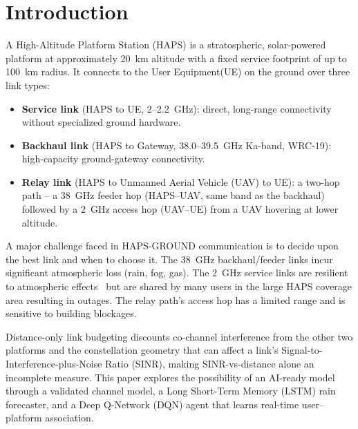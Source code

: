 \documentclass[]{ieeeaccess}
\begin{document}
\titlepgskip=-15pt

\maketitle

\section{Introduction}

A High-Altitude Platform Station (HAPS) is a stratospheric, solar-powered platform at approximately 20~km altitude with a fixed service footprint of up to 100~km radius. It connects to the User Equipment(UE) on the ground over three link types:

\begin{itemize}\setlength{\itemsep}{1pt}
  \item \textbf{Service link} (HAPS to UE, 2--2.2~GHz): direct, long-range connectivity without specialized ground hardware.
  \item \textbf{Backhaul link} (HAPS to Gateway, 38.0--39.5~GHz Ka-band, WRC-19): high-capacity ground-gateway connectivity.
  \item \textbf{Relay link} (HAPS to Unmanned Aerial Vehicle (UAV) to UE): a two-hop path -- a 38~GHz feeder hop (HAPS--UAV, same band as the backhaul) followed by a 2~GHz access hop (UAV--UE) from a UAV hovering at lower altitude.
\end{itemize}

A major challenge faced in HAPS-GROUND communication is to decide upon the best link and when to choose it. The 38~GHz backhaul/feeder links incur significant atmospheric loss (rain, fog, gas). The 2~GHz service links are resilient to atmospheric effects~\cite{itu_p618} but are shared by many users in the large HAPS coverage area resulting in outages. The relay path's access hop has a limited range and is sensitive to building blockages.

Distance-only link budgeting discounts co-channel interference from the other two platforms and the constellation geometry that can affect a link's Signal-to-Interference-plus-Noise Ratio (SINR), making SINR-vs-distance alone an incomplete measure. This paper explores the possibility of an AI-ready model through a validated channel model, a Long Short-Term Memory (LSTM) rain forecaster, and a Deep Q-Network (DQN) agent that learns real-time user--platform association.
\end{document}

